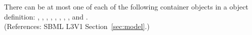 There can be at most one of each of the following container objects in a
\Model object definition: {\ListOfFunctionDefinitions,
\ListOfUnitDefinitions, \ListOfCompartments, \ListOfSpecies,
\ListOfParameters, \ListOfInitialAssignments, \ListOfRules,
\ListOfConstraints, \ListOfReactions} and {\ListOfEvents}.\\
(References: SBML L3V1 Section~\ref{sec:model}.)
